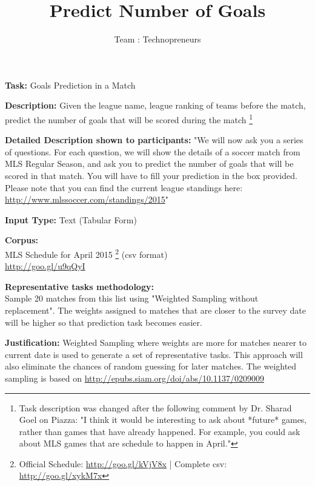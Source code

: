 \documentclass[12pt]{article}
\title{\textbf{Predict Number of Goals} \vspace{-2ex}}
\author{Team : Technopreneurs}
\date{\vspace{-5ex}}
\begin{document}
\maketitle

\begin{flushleft}
\textbf{Task:} Goals Prediction in a Match \par

\textbf{Description:} Given the league name, league ranking of teams before the match, predict the number of goals that will be scored during the match  
\footnote{Task description was changed after the following comment by Dr. Sharad Goel on Piazza: "I think it would be interesting to ask about *future* games, rather than games that have already happened. For example, you could ask about MLS games that are schedule to happen in April."}\par

\textbf{Detailed Description shown to participants:} "We will now ask you a series of questions. For each question, we will show the details of a soccer match from MLS Regular Season, and ask you to predict the number of goals that will be scored in that match. You will have to fill your prediction in the box provided. Please note that you can find the current league standings here: \url{http://www.mlssoccer.com/standings/2015}" \par

\textbf{Input Type:} Text (Tabular Form) \par

\textbf{Corpus: }\\
MLS Schedule for April 2015 
\footnote{Official Schedule: \url{http://goo.gl/kVjV8x} | Complete csv: \url{http://goo.gl/xykM7x}} 
(csv format)\\
\url{http://goo.gl/u9qQyI} \par

\textbf{Representative tasks methodology:} \\
Sample 20 matches from this list using "Weighted Sampling without replacement". The weights assigned to matches that are closer to the survey date will be higher so that prediction task becomes easier. \par

\textbf{Justification:} Weighted Sampling where weights are more for matches nearer to current date is used to generate a set of representative tasks. This approach will also eliminate the chances of random guessing for later matches. The weighted sampling is based on \url{http://epubs.siam.org/doi/abs/10.1137/0209009} \par


\end{flushleft}
\end{document}
